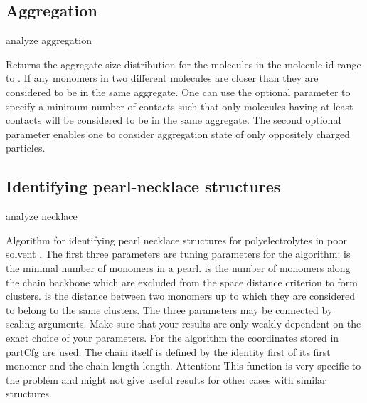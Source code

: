 \subsection{Aggregation}
\label{analyze:aggregation}

\begin{essyntax}
  analyze aggregation  
   
\end{essyntax}
Returns the aggregate size distribution for the molecules in the
molecule id range  to . If any
monomers in two different molecules are closer than
 they are considered to be in the same aggregate.
One can use the optional  parameter to specify a
minimum number of contacts such that only molecules having at least
 contacts will be considered to be in the same
aggregate. The second optional parameter 
enables one to consider aggregation state of only oppositely charged
particles.

\subsection{Identifying pearl-necklace structures}
\label{analyze:necklace}

\begin{essyntax}
 analyze necklace   
  
\end{essyntax}
Algorithm for identifying pearl necklace structures for
polyelectrolytes in poor solvent \citep{limbach03a}. The first three
parameters are tuning parameters for the algorithm:
 is the minimal number of monomers in a pearl.
 is the number of monomers along the chain backbone
which are excluded from the space distance criterion to form clusters.
 is the distance between two monomers up to which
they are considered to belong to the same clusters. The three
parameters may be connected by scaling arguments. Make sure that your
results are only weakly dependent on the exact choice of your
parameters. For the algorithm the coordinates stored in partCfg are
used. The chain itself is defined by the identity first of its first
monomer and the chain length length.  Attention: This function is very
specific to the problem and might not give useful results for other
cases with similar structures.


